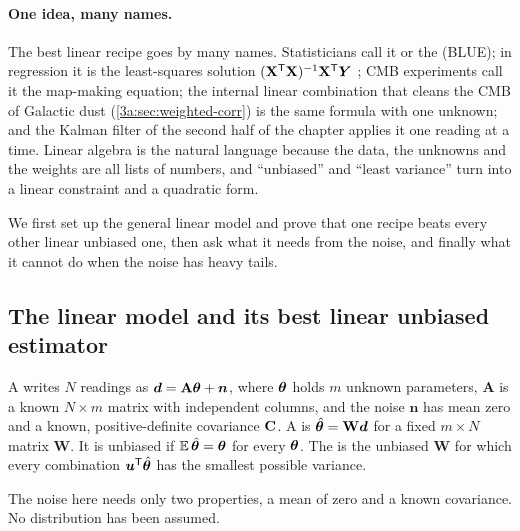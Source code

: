 \paragraph{One idea, many names.}
The best linear recipe goes by many names. Statisticians call it
 or the  (BLUE); in regression it is the least-squares solution
$(\mathbf X^{\mathsf{T}}\mathbf X)^{-1}\mathbf X^{\mathsf{T}}\bm Y$ ;
CMB experiments call it the map-making equation; the internal linear
combination that cleans the CMB of Galactic dust (\cref{3a:sec:weighted-corr})
is the same formula with one unknown; and the Kalman filter of the second
half of the chapter applies it one reading at a time. Linear algebra is the
natural language because the data, the unknowns and the weights are all
lists of numbers, and ``unbiased'' and ``least variance'' turn into a linear
constraint and a quadratic form.

We first set up the general linear model and prove that one recipe beats
every other linear unbiased one, then ask what it needs from the noise, and
finally what it cannot do when the noise has heavy tails.

\subsection{The linear model and its best linear unbiased estimator}
\label{T5a:sec:blue-proof}

\begin{workdef}
A  writes $N$ readings as
$\bm{d}=\mathbf A\bm{\theta}+\bm n$, where $\bm{\theta}$ holds $m$ unknown parameters,
$\mathbf A$ is a known $N\times m$ matrix  with independent columns, and the noise
$\bm n$ has mean zero and a known, positive-definite covariance $\mathbf{C}$.
A  is $\hat{\bm{\theta}}=\mathbf W\bm{d}$ for a fixed
$m\times N$ matrix $\mathbf W$. It is unbiased if $\E\hat\params=\params$ for
every $\bm{\theta}$. The  is the
unbiased $\mathbf W$ for which every combination $\bm u^{\mathsf{T}}\hat{\bm{\theta}}$ has the
smallest possible variance.
\end{workdef}

The noise here needs only two properties, a mean of zero and a known
covariance. No distribution has been assumed.

